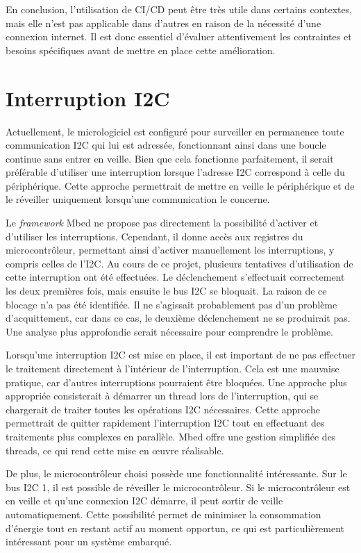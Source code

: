 En conclusion, l'utilisation de CI/CD peut être très utile dans certains contextes, mais elle n'est pas applicable dans d'autres en raison de la nécessité d'une connexion internet.
Il est donc essentiel d'évaluer attentivement les contraintes et besoins spécifiques avant de mettre en place cette amélioration.

\section{Interruption I2C}

Actuellement, le micrologiciel est configuré pour surveiller en permanence toute communication I2C qui lui est adressée, fonctionnant ainsi dans une boucle continue sans entrer en veille.
Bien que cela fonctionne parfaitement, il serait préférable d'utiliser une interruption lorsque l'adresse I2C correspond à celle du périphérique.
Cette approche permettrait de mettre en veille le périphérique et de le réveiller uniquement lorsqu'une communication le concerne.

Le \textit{framework} Mbed ne propose pas directement la possibilité d'activer et d'utiliser les interruptions.
Cependant, il donne accès aux registres du microcontrôleur, permettant ainsi d'activer manuellement les interruptions, y compris celles de l'I2C.
Au cours de ce projet, plusieurs tentatives d'utilisation de cette interruption ont été effectuées.
Le déclenchement s'effectuait correctement les deux premières fois, mais ensuite le bus I2C se bloquait.
La raison de ce blocage n'a pas été identifiée.
Il ne s'agissait probablement pas d'un problème d'acquittement, car dans ce cas, le deuxième déclenchement ne se produirait pas.
Une analyse plus approfondie serait nécessaire pour comprendre le problème.

Lorsqu'une interruption I2C est mise en place, il est important de ne pas effectuer le traitement directement à l'intérieur de l'interruption.
Cela est une mauvaise pratique, car d'autres interruptions pourraient être bloquées.
Une approche plus appropriée consisterait à démarrer un thread lors de l'interruption, qui se chargerait de traiter toutes les opérations I2C nécessaires.
Cette approche permettrait de quitter rapidement l'interruption I2C tout en effectuant des traitements plus complexes en parallèle.
Mbed offre une gestion simplifiée des threads, ce qui rend cette mise en œuvre réalisable.

De plus, le microcontrôleur choisi possède une fonctionnalité intéressante.
Sur le bus I2C 1, il est possible de réveiller le microcontrôleur. Si le microcontrôleur est en veille et qu'une connexion I2C démarre, il peut sortir de veille automatiquement.
Cette possibilité permet de minimiser la consommation d'énergie tout en restant actif au moment opportun, ce qui est particulièrement intéressant pour un système embarqué.

